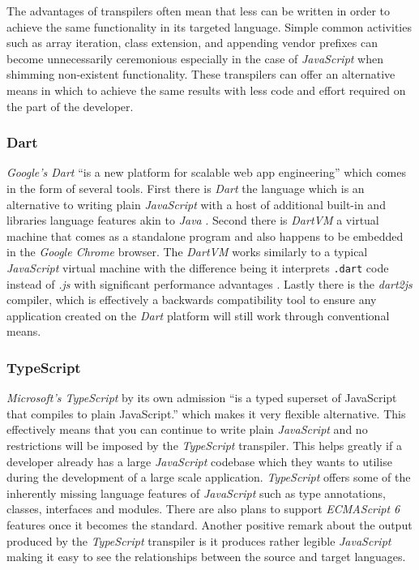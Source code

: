 \documentclass[final]{cmpreport}
\begin{document}
The advantages of transpilers often mean that less can be written in order to achieve the same functionality in its targeted language. Simple common activities such as array iteration, class extension, and appending vendor prefixes can become unnecessarily ceremonious especially in the case of \textit{JavaScript} when shimming non-existent functionality. These transpilers can offer an alternative means in which to achieve the same results with less code and effort required on the part of the developer.
\subsubsection{Dart}
\textit{Google's Dart} ``is a new platform for scalable web app engineering'' which comes in the form of several tools. First there is \textit{Dart} the language which is an alternative to writing plain \textit{JavaScript} with a host of additional built-in and libraries language features akin to \textit{Java} \cite{Fortuna}. Second there is \textit{DartVM} a virtual machine that comes as a standalone program and also happens to be embedded in the \textit{Google Chrome} browser. The \textit{DartVM} works similarly to a typical \textit{JavaScript} virtual machine with the difference being it interprets \texttt{.dart} code instead of \textit{.js} with significant performance advantages \cite{Schneider}. Lastly there is the \textit{dart2js} compiler, which is effectively a backwards compatibility tool to ensure any application created on the \textit{Dart} platform will still work through conventional means.

\subsubsection{TypeScript}
\textit{Microsoft's TypeScript} by its own admission ``is a typed superset of JavaScript that compiles to plain JavaScript.'' which makes it very flexible alternative. This effectively means that you can continue to write plain \textit{JavaScript} and no restrictions will be imposed by the \textit{TypeScript} transpiler. This helps greatly if a developer already has a large \textit{JavaScript} codebase which they wants to utilise during the development of a large scale application. \textit{TypeScript} offers some of the inherently missing language features of \textit{JavaScript} such as type annotations, classes, interfaces and modules. There are also plans to support \textit{ECMAScript 6} features once it becomes the standard. Another positive remark about the output produced by the \textit{TypeScript} transpiler is it produces rather legible \textit{JavaScript} making it easy to see the relationships between the source and target languages.
\end{document}
